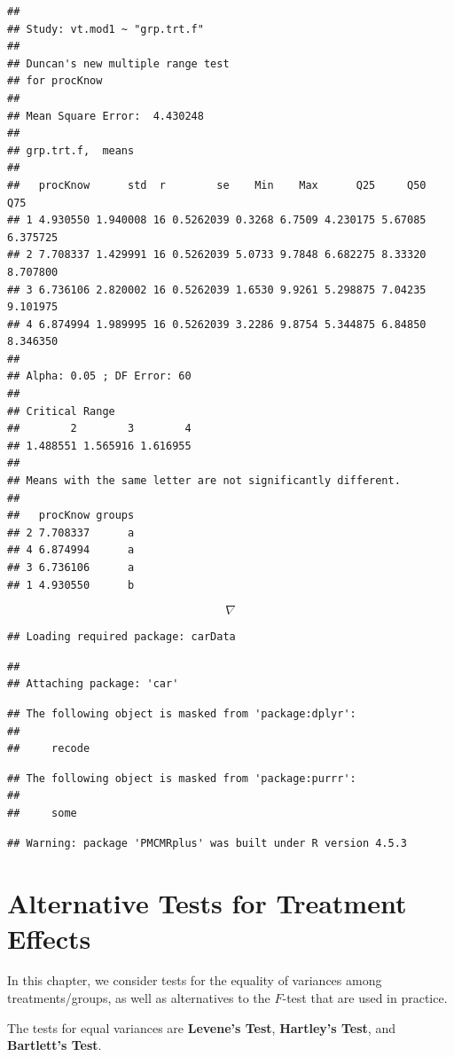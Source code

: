 \documentclass[
]{book}
\begin{document}
\begin{verbatim}
## 
## Study: vt.mod1 ~ "grp.trt.f"
## 
## Duncan's new multiple range test
## for procKnow 
## 
## Mean Square Error:  4.430248 
## 
## grp.trt.f,  means
## 
##   procKnow      std  r        se    Min    Max      Q25     Q50      Q75
## 1 4.930550 1.940008 16 0.5262039 0.3268 6.7509 4.230175 5.67085 6.375725
## 2 7.708337 1.429991 16 0.5262039 5.0733 9.7848 6.682275 8.33320 8.707800
## 3 6.736106 2.820002 16 0.5262039 1.6530 9.9261 5.298875 7.04235 9.101975
## 4 6.874994 1.989995 16 0.5262039 3.2286 9.8754 5.344875 6.84850 8.346350
## 
## Alpha: 0.05 ; DF Error: 60 
## 
## Critical Range
##        2        3        4 
## 1.488551 1.565916 1.616955 
## 
## Means with the same letter are not significantly different.
## 
##   procKnow groups
## 2 7.708337      a
## 4 6.874994      a
## 3 6.736106      a
## 1 4.930550      b
\end{verbatim}

\[\nabla\]

\begin{verbatim}
## Loading required package: carData
\end{verbatim}

\begin{verbatim}
## 
## Attaching package: 'car'
\end{verbatim}

\begin{verbatim}
## The following object is masked from 'package:dplyr':
## 
##     recode
\end{verbatim}

\begin{verbatim}
## The following object is masked from 'package:purrr':
## 
##     some
\end{verbatim}

\begin{verbatim}
## Warning: package 'PMCMRplus' was built under R version 4.5.3
\end{verbatim}

\chapter{Alternative Tests for Treatment
Effects}\label{alternative-tests-for-treatment-effects}

In this chapter, we consider tests for the equality of variances among
treatments/groups, as well as alternatives to the \(F\)-test that are
used in practice.

The tests for equal variances are \textbf{Levene's Test},
\textbf{Hartley's Test}, and \textbf{Bartlett's Test}.
\end{document}
